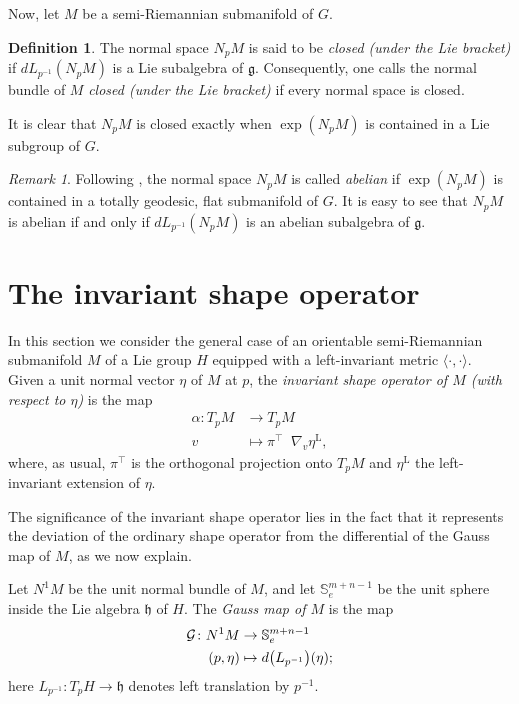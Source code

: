 \documentclass[a4paper,12pt,oneside]{amsart}
\newcommand{\diff}{\mathop{}\!d}
\newcommand{\grad}{\mathop{}\!\nabla}
\theoremstyle{plain}
\theoremstyle{remark}
\newtheorem{remark}[theorem]{Remark}
\theoremstyle{definition}
\newtheorem{definition}[theorem]{Definition}
\begin{document}
Now, let $M$ be a semi-Riemannian submanifold of $G$.

\begin{definition}\label{ClosedNormalBundleDEF}
The normal space $N_{p}M$ is said to be \textit{closed \textup{(}under the Lie bracket\textup{)}} if $dL_{p^{-1}}(N_{p}M)$ is a Lie subalgebra of $\mathfrak{g}$. Consequently, one calls the normal bundle of $M$ \textit{closed \textup{(}under the Lie bracket\textup{)}} if every normal space is closed.
\end{definition}

It is clear that $N_{p}M$ is closed exactly when $\exp(N_{p}M)$ is contained in a Lie subgroup of $G$.

\begin{remark}
Following \cite{terng1995}, the normal space $N_{p}M$ is called \textit{abelian} if $\exp(N_{p}M)$ is contained in a totally geodesic, flat submanifold of $G$. It is easy to see that $N_{p}M$ is abelian if and only if $dL_{p^{-1}}(N_{p}M)$ is an abelian subalgebra of $\mathfrak{g}$.
\end{remark}

\section{The invariant shape operator} \label{ISOP}
In this section we consider the general case of an orientable semi-Riemannian submanifold $M$ of a Lie group $H$ equipped with a left-invariant metric $\langle \cdot {,}\cdot\rangle$. Given a unit normal vector $\eta$ of $M$ at $p$, the \textit{invariant shape operator of $M$ \textup{(}with respect to $\eta$\textup{)}} is the map
\begin{align*}
\alpha \colon T_{p}M &\to T_{p}M \\
v &\mapsto \pi^{\top}\grad_{v}\eta^{\mathrm{L}},
\end{align*}
where, as usual, $\pi^{\top}$ is the orthogonal projection onto $T_{p}M$ and $\eta^{\mathrm{L}}$ the left-invariant extension of $\eta$.

The significance of the invariant shape operator lies in the fact that it represents the deviation of the ordinary shape operator from the differential of the Gauss map of $M$, as we now explain.%

Let $N^{1}M$ be the unit normal bundle of $M$, and let $\mathbb{S}^{m+n-1}_{e}$ be the unit sphere inside the Lie algebra $\mathfrak{h}$ of $H$. The \textit{Gauss map of $M$} is the map
\begin{align*}
\mathcal{G}\colon N^{1}M &\to \mathbb{S}^{m+n-1}_{e}\\
(p,\eta) &\mapsto \diff\mleft(L_{p^{-1}}\mright)(\eta);
\end{align*}
here $L_{p^{-1}} \colon T_{p}H \to \mathfrak{h}$ denotes left translation by $p^{-1}$.
\end{document}

